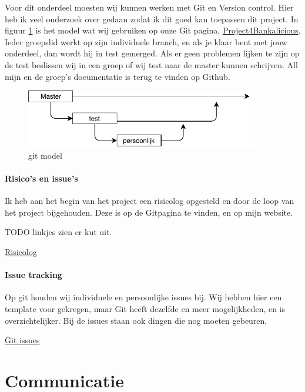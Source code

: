 \documentclass{article}
\begin{document}
Voor dit onderdeel moesten wij kunnen werken met Git en Version control.
Hier heb ik veel onderzoek over gedaan zodat ik dit goed kan toepassen dit project.
In figuur \ref{fig: git model} is het model wat wij gebruiken op onze Git pagina, \href{https://github.com/Gewad/Project4Bankalicious}{Project4Bankalicious}.
Ieder groepslid werkt op zijn individuele branch, en als je klaar bent met jouw onderdeel, dan wordt hij in test gemerged.
Als er geen problemen lijken te zijn op de test beslissen wij in een groep of wij test naar de master kunnen schrijven.
All mijn en de groep's documentatie is terug te vinden op Github.

\begin{figure}[!h]
        \centering
        \includegraphics[height=1in]{git.pdf}
        \caption{git model}
        \label{fig: git model}
\end{figure}

\paragraph{Risico's en issue's}

Ik heb aan het begin van het project een risicolog opgesteld en door de loop van het project bijgehouden.
Deze is op de Gitpagina te vinden, en op mijn website.


TODO linkjes zien er kut uit.


\href{https://github.com/Gewad/Project4Bankalicious/blob/test/opdrachten/opdracht_h/opdracht_h_merijn/opdracht_h.pdf}{Risicolog}

\paragraph{Issue tracking}

Op git houden wij individuele en persoonlijke issues bij.
Wij hebben hier een template voor gekregen, maar Git heeft dezelfde en meer mogelijkheden, en is overzichtelijker.
Bij de issues staan ook dingen die nog moeten gebeuren, 

\href{https://github.com/Gewad/Project4Bankalicious/issues}{Git issues}

\newpage

\section{Communicatie}
\end{document}
